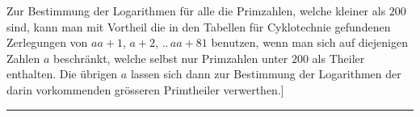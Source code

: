 Zur Bestimmung der Logarithmen für alle die Primzahlen, welche kleiner als $200$ sind, kann man mit Vortheil die in den Tabellen für Cyklotechnie gefundenen Zerlegungen von $aa+1$, $a+2$, $..\,aa+81$ benutzen, wenn man sich auf diejenigen Zahlen $a$ beschränkt, welche selbst nur Primzahlen unter $200$ als Theiler enthalten. Die übrigen $a$ lassen sich dann zur Bestimmung der Logarithmen der darin vorkommenden grösseren Primtheiler verwerthen.]
\par\nobreak\smallskip\noindent\hfill\rule{.32\textwidth}{.3pt}\hfill\mbox{}\par
